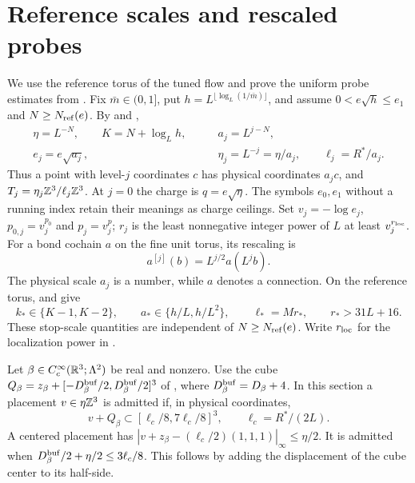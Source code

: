 \section{Reference scales and rescaled probes}
\label{subsec:interacting-stop-probe}

We use the reference torus of the tuned flow and prove the
uniform probe estimates from \cite[\S21.1]{QED3Master}.
Fix $\bar m\in(0,1]$, put
$h=L^{\lfloor\log_L(1/\bar m)\rfloor}$, and assume
$0<e\sqrt h\le e_1$ and $N\ge N_{\rm ref}(e)$.
By \cite[(47)]{CoverTuning} and
\cite[(53)]{CoverTuning},
\begin{equation}\label{eq:interacting-physical-scales}
 \begin{aligned}
 \eta=L^{-N},\qquad K=N+\log_Lh,\qquad
 &a_j=L^{j-N},\\
 e_j=e\sqrt{a_j},\qquad
 &\eta_j=L^{-j}=\eta/a_j,\qquad \ell_j=R^*/a_j .
 \end{aligned}
\end{equation}
Thus a point with level-$j$ coordinates $c$
has physical coordinates $a_jc$, and
$T_j=\eta_j\mathbb Z^3/\ell_j\mathbb Z^3$.
At $j=0$ the charge is $q=e\sqrt\eta$.
The symbols $e_0,e_1$ without a running
index retain their meanings as charge ceilings.
Set $v_j=-\log e_j$, $p_{0,j}=v_j^{p_0}$ and $p_j=v_j^p$;
$r_j$ is the least nonnegative integer power of $L$ at least
$v_j^{r_{\rm loc}}$.
For a bond cochain $a$ on the fine unit torus,
its rescaling is
\begin{equation}\label{eq:interacting-connection-rescaling}
                    a^{[j]}(b)=L^{j/2}a(L^jb).
\end{equation}
The physical scale $a_j$ is a number, while
$a$ denotes a connection.
On the reference torus,
\cite[(54)]{CoverTuning} and
\cite[(50)]{CoverTuning} give
\[
 k_*\in\{K-1,K-2\},\qquad
 a_*\in\{h/L,h/L^2\},\qquad
 \ell_*=Mr_*,\qquad r_*>31L+16.
\]
These stop-scale quantities are independent
of $N\ge N_{\rm ref}(e)$.
Write $r_{\rm loc}$ for the localization
power in \cite[\S6.1]{CoverTuning}.

Let $\beta\in C_c^\infty(\mathbb R^3;\Lambda^2)$ be real
and nonzero. Use the cube
$Q_\beta=z_\beta+[-D_\beta^{\rm buf}/2,D_\beta^{\rm buf}/2]^3$
of ,
where $D_\beta^{\rm buf}=D_\beta+4$.
In this section a placement $v\in\eta\mathbb Z^3$
is admitted if, in physical coordinates,
\begin{equation}\label{eq:interacting-admitted-placement}
              v+Q_\beta\subset[\ell_c/8,7\ell_c/8]^3,
              \qquad \ell_c=R^*/(2L).
\end{equation}
A centered placement has
$|v+z_\beta-(\ell_c/2)(1,1,1)|_\infty\le\eta/2$.
It is admitted when
$D_\beta^{\rm buf}/2+\eta/2\le3\ell_c/8$.
This follows by adding the displacement
of the cube center to its half-side.

